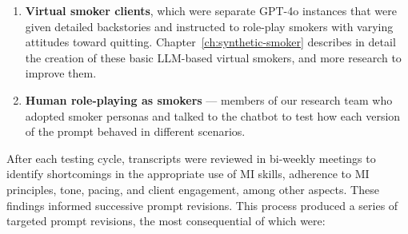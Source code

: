 \begin{enumerate}
    \item \textbf{Virtual smoker clients}, which were separate GPT-4o instances that were given detailed backstories and instructed to role-play smokers with varying attitudes toward quitting. Chapter~\ref{ch:synthetic-smoker} describes in detail the creation of these basic LLM-based virtual smokers, and more research to improve them.
    \item \textbf{Human role-playing as smokers} --- members of our research team who adopted smoker personas and talked to the chatbot to test how each version of the prompt behaved in different scenarios.
\end{enumerate}

After each testing cycle, transcripts were reviewed in bi-weekly meetings to identify shortcomings in the appropriate use of MI skills, adherence to MI principles, tone, pacing, and client engagement, among other aspects. These findings informed successive prompt revisions. 
This process produced a series of targeted prompt revisions, the most consequential of which were:


